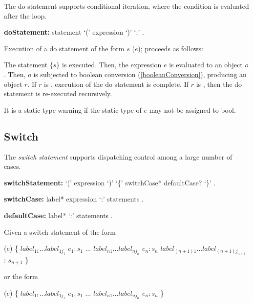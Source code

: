 \documentclass{article}
\newcommand{\code}[1]{{\sf #1}}
\begin{document}
\LMHash{}
The do statement supports conditional iteration, where the condition is evaluated after the loop.

\begin{grammar}
{\bf doStatement:}
    \DO{} statement \WHILE{} `(' expression `)' `{\escapegrammar ;}'%
      .
 \end{grammar}


\LMHash{}
Execution of a do statement of the form \code{\DO{} $s$ \WHILE{} ($e$);} proceeds as follows:

\LMHash{}
The statement $\{s\}$ is executed. Then, the expression $e$ is evaluated to an object $o$. Then, $o$ is  subjected to boolean conversion (\ref{booleanConversion}), producing an object $r$. If $r$ is \FALSE{}, execution of the do statement is complete. If $r$ is \TRUE{}, then the do statement is re-executed recursively.

\LMHash{}
It is a static type warning if the static type of $e$ may not be assigned to \code{bool}.

\subsection{Switch}

\LMHash{}
The {\em switch statement} supports dispatching control among a large number of cases.

 \begin{grammar}
{\bf switchStatement:}
      \SWITCH{} `(' expression `)' `\{' switchCase* defaultCase? `\}'%
    .


{\bf switchCase:}
      label* \CASE{} expression `{\escapegrammar :}' statements
    .

{\bf defaultCase:}
      label*  \DEFAULT{} `{\escapegrammar :}' statements
    .
 \end{grammar}

\LMHash{}
 Given a switch statement of the form

\begin{dartCode}
\SWITCH{} ($e$) \{
   $label_{11} \ldots label_{1j_1}$ \CASE{} $e_1: s_1$
   $\ldots$
   $label_{n1} \ldots label_{nj_n}$ \CASE{} $e_n: s_n$
   $label_{(n+1)1} \ldots label_{(n+1)j_{n+1}}$ \DEFAULT{}: $s_{n+1}$
\}
\end{dartCode}

 or the form

\begin{dartCode}
\SWITCH{} ($e$) \{
   $label_{11} \ldots label_{1j_1}$ \CASE{} $e_1: s_1$
   $\ldots$
   $label_{n1} \ldots label_{nj_n}$ \CASE{} $e_n: s_n$
\}
\end{dartCode}
\end{document}
